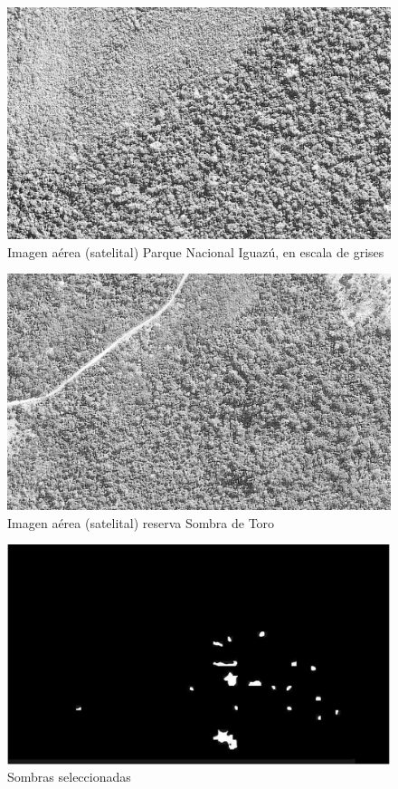 \begin{figure}[h!]
    \includegraphics[width=\textwidth]{Imagenes/Homomorfico/PNI1gris.jpg}
     \hfill
     \caption{Imagen aérea (satelital) Parque Nacional Iguazú, en escala de grises}
\end{figure}

\begin{figure}[h!]
    \includegraphics[width=\textwidth]{Imagenes/Homomorfico/ST2.png}
     \hfill
     \caption{Imagen aérea (satelital) reserva Sombra de Toro}
\end{figure}

\begin{figure}[h!]
    \includegraphics[width=\textwidth]{Imagenes/Homomorfico/ST2_masked.png}
     \hfill
     \caption{Sombras seleccionadas}
\end{figure}